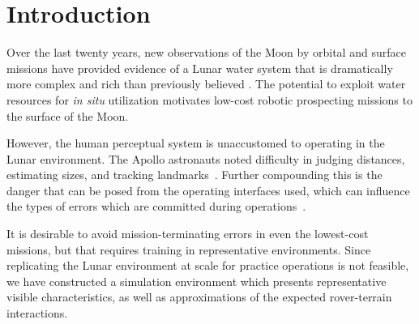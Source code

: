 \documentclass[twocolumn,letterpaper]{IEEEAerospaceCLS}  %
\begin{document}

\listoftodos



\section{Introduction}
\label{sec:intro}

Over the last twenty years, new observations of the Moon by orbital and surface missions have provided evidence of a Lunar water system that is dramatically more complex and rich than previously believed \cite{colaprete2017resource}.
The potential to exploit water resources for \emph{in situ} utilization motivates low-cost robotic prospecting missions to the surface of the Moon.

However, the human perceptual system is unaccustomed to operating in the Lunar environment.
The Apollo astronauts noted difficulty in judging distances, estimating sizes, and tracking landmarks~\cite{vaniman1991lunar}.  Further compounding this is the danger that can be posed from the operating interfaces used, which can influence the types of errors which are committed during operations~\cite{mcgovern1988human,kelly2011real}.  

It is desirable to avoid mission-terminating errors in even the lowest-cost missions, but that requires training in representative environments.  
Since replicating the Lunar environment at scale for practice operations is not feasible, we have constructed a simulation environment which presents representative visible characteristics, as well as approximations of the expected rover-terrain interactions.  
\end{document}

